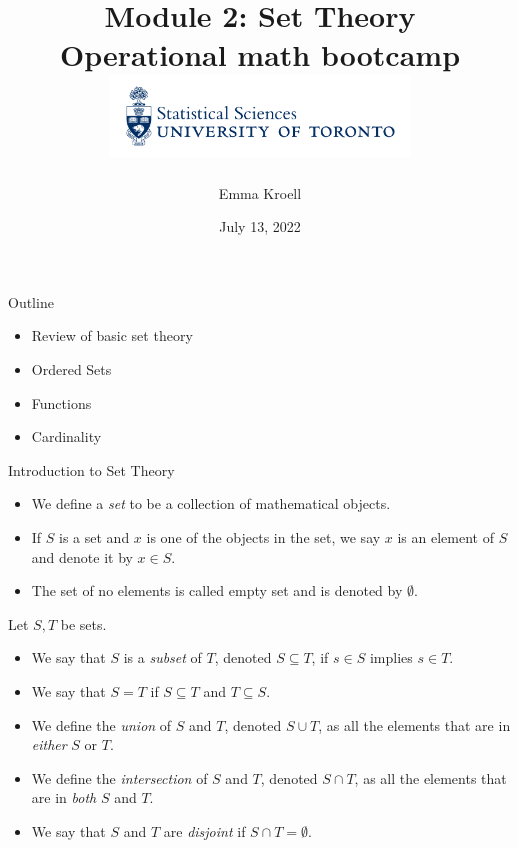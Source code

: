 \documentclass [aspectratio=169, handout]{beamer}
\title[]{Module 2: Set Theory \\ {\large Operational math bootcamp}\\ \includegraphics[width=8cm]{dept_logo.png}\vspace{-1em}}
\author[]{Emma Kroell}
\institute[]{University of Toronto}
\date{July 13, 2022}
\begin{document}
{
\begin{frame}
    \titlepage
\end{frame}
}

\begin{frame}{Outline}
    \begin{itemize}
    	\item Review of basic set theory
	\item Ordered Sets
        \item Functions
        \item Cardinality
    \end{itemize}
\end{frame}

\begin{frame}{Introduction to Set Theory}
\begin{itemize}
  \setlength\itemsep{1em}
\item We define a \emph{set} to be a collection of mathematical objects.
\item  If $S$ is a set and $x$ is one of the objects in the set, we say $x$ is an element of $S$ and denote it by $x\in S$.
\item The set of no elements is called empty set and is denoted by $\emptyset$.
\end{itemize}
\end{frame}

\begin{frame}
\begin{definition}
Let $S, T$ be sets. 
\begin{itemize}
    \item We say that $S$ is a \emph{subset} of $T$, denoted $S\subseteq T$, if $s\in S$ implies $s\in T$. 
    \item We say that $S=T$ if $S\subseteq T$ and $T\subseteq S$.
    \item We define the \emph{union} of $S$ and $T$, denoted $S \cup T$, as all the elements that are in \emph{either} $S$ or $T$.
    \item We define the \emph{intersection} of $S$ and $T$, denoted $S \cap T$, as all the elements that are in \emph{both} $S$ and $T$.
    \item We say that $S$ and $T$ are \emph{disjoint} if $S \cap T = \emptyset$.
\end{itemize}
\end{definition}
\end{frame}
\end{document}
